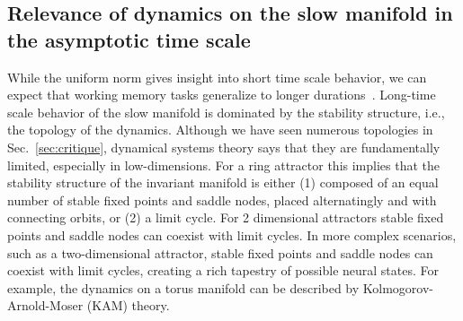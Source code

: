 \documentclass{article} %
\newcommand{\mpcomment}[1]{\textcolor{mpcolor}{(#1)}}
\newcounter{ct}
\theoremstyle{definition}
\theoremstyle{remark}
\begin{document}
\subsection{Relevance of dynamics on the slow manifold in the asymptotic time scale}\label{sec:attractor_bif}
While the uniform norm gives insight into short time scale behavior, we can expect that working memory tasks generalize to longer durations~\citep{Park2023a}.
Long-time scale behavior of the slow manifold is dominated by the stability structure, i.e., the topology of the dynamics.
Although we have seen numerous topologies in Sec.~\ref{sec:critique}, dynamical systems theory says that they are fundamentally limited, especially in low-dimensions.
For a ring attractor this implies that the stability structure of the invariant manifold is either
(1) composed of an equal number of stable fixed points and saddle nodes, placed alternatingly and with connecting orbits, or (2) a limit cycle.
For 2 dimensional attractors stable fixed points and saddle nodes can coexist with limit cycles.
In more complex scenarios, such as a two-dimensional attractor, stable fixed points and saddle nodes can coexist with limit cycles, creating a rich tapestry of possible neural states.
For example, the dynamics on a torus manifold can be described by Kolmogorov-Arnold-Moser (KAM) theory.

\end{document}
